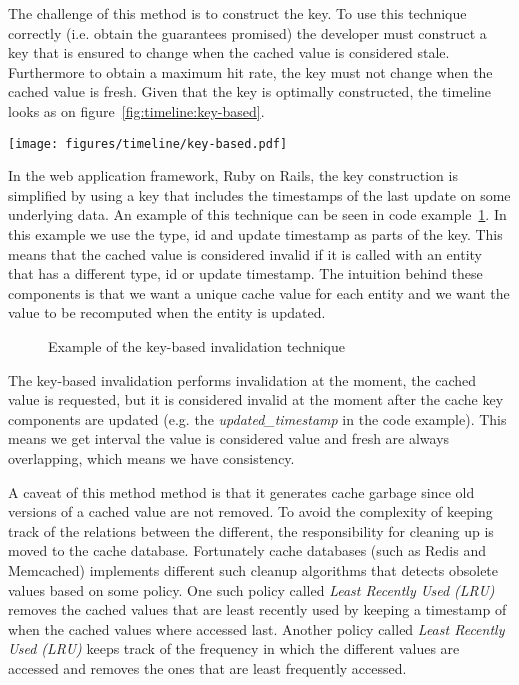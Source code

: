 The challenge of this method is to construct the key. To use this technique correctly (i.e. obtain the guarantees promised) the developer must construct a key that is ensured to change when the cached value is considered stale. Furthermore to obtain a maximum hit rate, the key must not change when the cached value is fresh. Given that the key is optimally constructed, the timeline looks as on figure~\ref{fig:timeline:key-based}.

\begin{figure*}[ht!]
  \centering
  \texttt{[image: figures/timeline/key-based.pdf]}
  \caption{The lifecycle of the key-based invalidation technique}
  \label{fig:timeline:key-based}
\end{figure*}

In the web application framework, Ruby on Rails, the key construction is simplified by using a key that includes the timestamps of the last update on some underlying data. An example of this technique can be seen in code example~\ref{code:key-based-invalidation}. In this example we use the type, id and update timestamp as parts of the key. This means that the cached value is considered invalid if it is called with an entity that has a different type, id or update timestamp. The intuition behind these components is that we want a unique cache value for each entity and we want the value to be recomputed when the entity is updated.

\begin{figure}

\caption{Example of the key-based invalidation technique}
\label{code:key-based-invalidation}
\end{figure}

The key-based invalidation performs invalidation at the moment, the cached value is requested, but it is considered invalid at the moment after the cache key components are updated (e.g. the \emph{updated\_timestamp} in the code example). This means we get interval the value is considered value and fresh are always overlapping, which means we have consistency.

A caveat of this method method is that it generates cache garbage since old versions of a cached value are not removed. To avoid the complexity of keeping track of the relations between the different, the responsibility for cleaning up is moved to the cache database. Fortunately cache databases (such as Redis and Memcached) implements different such cleanup algorithms that detects obsolete values based on some policy. One such policy called \emph{Least Recently Used (LRU)} removes the cached values that are least recently used by keeping a timestamp of when the cached values where accessed last. Another policy called \emph{Least Recently Used (LRU)} keeps track of the frequency in which the different values are accessed and removes the ones that are least frequently accessed.


